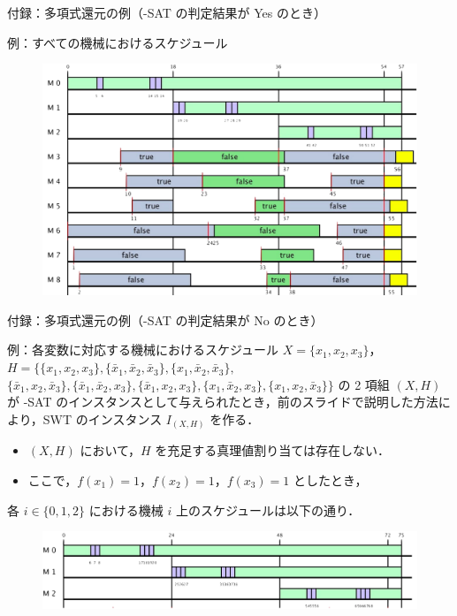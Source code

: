 \documentclass[dvipdfmx]{beamer}
\begin{document}
    \begin{frame}{付録：多項式還元の例（{-SAT} の判定結果が Yes のとき）}
      \begin{exampleblock}{例：すべての機械におけるスケジュール}
        \begin{figure}[h]
          \centering
          \includegraphics[width = 12cm]{figure/reductionExample3.pdf}
        \end{figure}
      \end{exampleblock}
    \end{frame}

    \begin{frame}{付録：多項式還元の例（{-SAT} の判定結果が No のとき）}
      \begin{exampleblock}{例：各変数に対応する機械におけるスケジュール}
        $X = \{x_1,x_2,x_3\}$，$H = \big\{
        \{x_1,x_2,x_3\},
        \{\bar x_1,\bar x_2,\bar x_3\},
        \{x_1,\bar x_2,\bar x_3\},$
        \\
        $\{\bar x_1,x_2,\bar x_3\},
        \{\bar x_1,\bar x_2,x_3\},
        \{\bar x_1,x_2,x_3\},
        \{x_1,\bar x_2,x_3\},
        \{x_1,x_2,\bar x_3\}
        \big\}$ の 2 項組 $(X,H)$ が {-SAT} のインスタンスとして与えられたとき，前のスライドで説明した方法により，SWT のインスタンス $I_{(X,H)}$ を作る．
        \begin{itemize}
          \item $(X,H)$ において，$H$ を充足する真理値割り当ては存在しない．
          \item ここで，$f(x_1) = 1$，$f(x_2) = 1$，$f(x_3) = 1$ としたとき，
        \end{itemize}
        各 $i \in \{0,1,2\}$ における機械 $i$ 上のスケジュールは以下の通り．
        \begin{figure}[h]
          \centering
          \includegraphics[width = 12cm]{figure/reductionExample4.pdf}
        \end{figure}
      \end{exampleblock}
    \end{frame}
\end{document}
